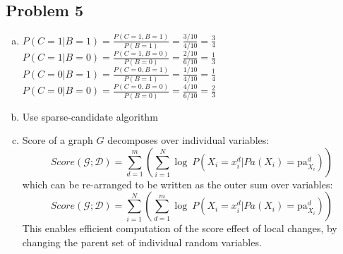\documentclass[11pt]{extarticle} %
\begin{document}
\subsection*{Problem 5}
\begin{enumerate}[(a)]
\item
$P(C = 1|B = 1) = \frac{P(C=1, B=1)}{P(B=1)} = \frac{3/10}{4/10} = \frac{3}{4}$ \\
$P(C = 1|B = 0) = \frac{P(C=1, B=0)}{P(B=0)} = \frac{2/10}{6/10} = \frac{1}{3}$ \\
$P(C = 0|B = 1) = \frac{P(C=0, B=1)}{P(B=1)} = \frac{1/10}{4/10} = \frac{1}{4}$ \\
$P(C = 0|B = 0) = \frac{P(C=0, B=0)}{P(B=0)} = \frac{4/10}{6/10} = \frac{2}{3}$ \\
\item Use sparse-candidate algorithm 
\item Score of a graph $G$ decomposes over individual variables:
\[ Score(\mathcal{G};\mathcal{D}) = \sum\limits_{d=1}^{m}\left(\sum\limits_{i=1}^{N} \log\ P(X_i = x_i^d | Pa(X_i) = \text{pa}_{X_i}^d) \right)\]
which can be re-arranged to be written as the outer sum over variables:
\[ Score(\mathcal{G};\mathcal{D}) = \sum\limits_{i=1}^{N}\left(\sum\limits_{d=1}^{m} \log\ P(X_i = x_i^d | Pa(X_i) = \text{pa}_{X_i}^d) \right)\] 
This enables efficient computation of the score effect of local changes, by changing the parent set of individual random variables.

\end{enumerate}
\end{document}
